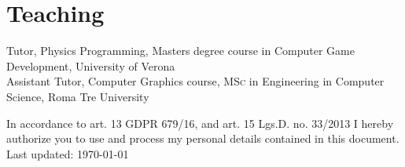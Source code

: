 \documentclass[11pt, a4paper]{article} %
\newcommand{\years}[1]{\marginnote{\scriptsize #1}} %
\begin{document}




\section*{Teaching}

\years{2019} Tutor, Physics Programming, Masters degree course in Computer Game Development, University of Verona\\
\years{2016} Assistant Tutor, Computer Graphics course, \textsc{MSc} in Engineering in Computer Science, Roma Tre University\\




\vfill{} %


\begin{center}
{\scriptsize In accordance to art. 13 GDPR 679/16, and art. 15 Lgs.D. no. 33/2013 I hereby authorize you to use and process my personal details contained in this document.\\ Last updated: \today} %
\end{center}

\end{document}
